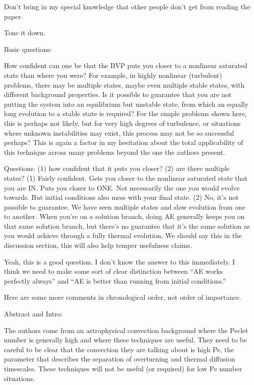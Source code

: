 \documentclass[aps, 11pt, singlecolumn]{revtex4-1} %
\begin{document}
\begin{singlespace}
Don't bring in my special knowledge that other people don't get from
reading the paper.

Tone it down.

\begin{myquotation}
Basic questions:

How confident can one be that the BVP puts you closer to a nonlinear
saturated state than where you were? For example, in highly nonlinear
(turbulent) problems, there may be multiple states, maybe even
multiple stable states, with different background properties. Is it
possible to guarantee that you are not putting the system into an
equilibrium but unstable state, from which an equally long evolution
to a stable state is required? For the simple problems shown here,
this is perhaps not likely, but for very high degrees of turbulence,
or situations where unknown instabilities may exist, this process may
not be so successful perhaps? This is again a factor in my hesitation
about the total applicability of this technique across many problems
beyond the one the authors present.
\end{myquotation}
Questions: (1) how confident that it puts you closer? (2) are there multiple states?
(1) Fairly confident. Gets you closer to the nonlinear saturated state that you are
IN. Puts you closer to ONE. Not necessarily the one you would evolve towards. But
initial conditions also mess with your final state.
(2) No, it's not possible to guarantee. We have seen multiple states and
slow evolution from one to another. When you're on a solution branch, doing AE
generally keeps you on that same solution branch, but there's no guarantee that it's
the same solution as you would achieve through a fully thermal evolution. We should
say this in the discussion section, this will also help temper usefulness claims.

Yeah, this is a good question. I don't know the answer to this immediately.
I think we need to make some sort of clear distinction between ``AE works
perfectly always'' and ``AE is better than running from initial conditions.''


\begin{myquotation}
Here are some more comments in chronological order, not order of
importance.

Abstract and Intro:

The authors come from an astrophysical convection background where the
Peclet number is generally high and where these techniques are useful.
They need to be careful to be clear that the convection they are
talking about is high Pe, the parameter that describes the separation
of overturning and thermal diffusion timescales. These techniques will
not be useful (or required) for low Pe number situations.
\end{myquotation}


\end{singlespace}
\end{document}
